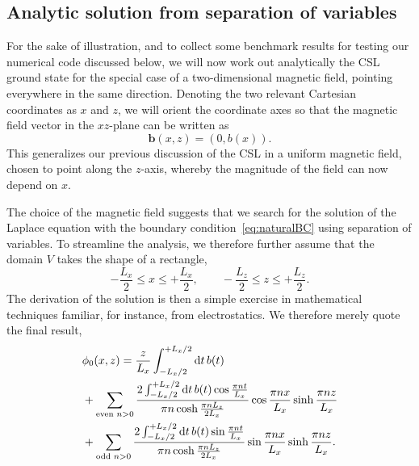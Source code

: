 \documentclass[pdflatex,iicol,sn-mathphys-num]{sn-jnl}
\let\p=\phi
\newcommand{\dd}{\text{d}}%
\newcommand{\vek}[1]{\bm{#1}}%
\newcommand{\bmag}{b}%
\begin{document}

\subsection{Analytic solution from separation of variables}
\label{subsec:nonuniformBzeroMseparation}

For the sake of illustration, and to collect some benchmark results for testing our numerical code discussed below, we will now work out analytically the CSL ground state for the special case of a two-dimensional magnetic field, pointing everywhere in the same direction. Denoting the two relevant Cartesian coordinates as $x$ and $z$, we will orient the coordinate axes so that the magnetic field vector in the $xz$-plane can be written as
\begin{equation}
\vek\bmag(x,z)=(0,\bmag(x)).
\label{eq:2d_straightH}
\end{equation}
This generalizes our previous discussion of the CSL in a uniform magnetic field, chosen to point along the $z$-axis, whereby the magnitude of the field can now depend on $x$.

The choice of the magnetic field suggests that we search for the solution of the Laplace equation with the boundary condition~\eqref{eq:naturalBC} using separation of variables. To streamline the analysis, we therefore further assume that the domain $V$ takes the shape of a rectangle,
\begin{equation}
-\frac{L_x}2\leq x\leq+\frac{L_x}2,\qquad
-\frac{L_z}2\leq z\leq+\frac{L_z}2.
\label{eq:rectangle}
\end{equation}
The derivation of the solution is then a simple exercise in mathematical techniques familiar, for instance, from electrostatics. We therefore merely quote the final result,
\begin{align}
\label{eq:solseparation}
&\p_0(x,z)=\frac{z}{L_x}\int_{-{L_x}/2}^{+{L_x}/2}\dd t\,\bmag(t)\\
\notag
&+\sum_{\text{even }n>0}\frac{2\int_{-{L_x}/2}^{+{L_x}/2}\dd t\,\bmag(t)\cos\frac{\pi nt}{L_x}}{\pi n\cosh\frac{\pi nL_z}{2L_x}}\cos\frac{\pi nx}{L_x}\sinh\frac{\pi nz}{L_x}\\
\notag
&+\sum_{\text{odd }n>0}\frac{2\int_{-{L_x}/2}^{+{L_x}/2}\dd t\,\bmag(t)\sin\frac{\pi nt}{L_x}}{\pi n\cosh\frac{\pi nL_z}{2L_x}}\sin\frac{\pi nx}{L_x}\sinh\frac{\pi nz}{L_x}.
\end{align}
\end{document}
